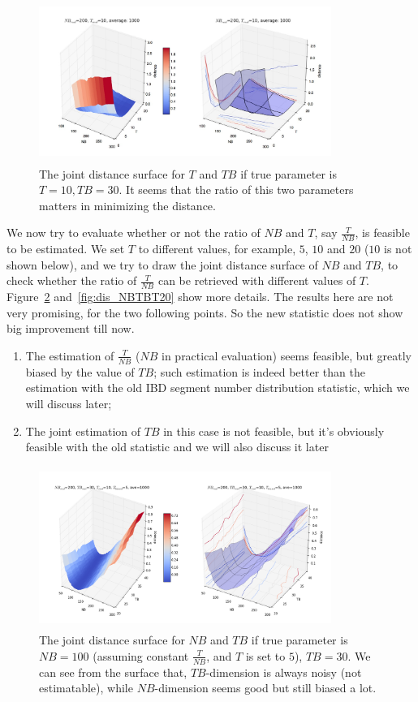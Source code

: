 \documentclass{bioinfo}
\begin{document}
\begin{figure}[h]
\centerline{\includegraphics[width=270pt, height=150pt]{like_NBT.jpg}}
\caption{The joint distance surface for $T$ and $TB$ if true parameter is $T=10,TB=30$. It seems that the ratio of this two parameters matters in minimizing the distance.}\label{fig:dis_NBT}
\end{figure}

We now try to evaluate whether or not the ratio of $NB$ and $T$, say $\frac{T}{NB}$, is feasible to be estimated. We set $T$ to different values, for example, $5$, $10$ and $20$ ($10$ is not shown below), and we try to draw the joint distance surface of $NB$ and $TB$, to check whether the ratio of $\frac{T}{NB}$ can be retrieved with different values of $T$. Figure~\ref{fig:dis_NBTBT5} and~\ref{fig:dis_NBTBT20} show more details. The results here are not very promising, for the two following points. So the new statistic does not show big improvement till now.

\begin{enumerate}
\item The estimation of $\frac{T}{NB}$ ($NB$ in practical evaluation) seems feasible, but greatly biased by the value of $TB$; such estimation is indeed better than the estimation with the old IBD segment number distribution statistic, which we will discuss later;
\item The joint estimation of $TB$ in this case is not feasible, but it's obviously feasible with the old statistic and we will also discuss it later
\end{enumerate}

\begin{figure}[h]
\centerline{\includegraphics[width=270pt, height=150pt]{like_NBTBT5_2.png}}
\caption{The joint distance surface for $NB$ and $TB$ if true parameter is $NB=100$ (assuming constant $\frac{T}{NB}$, and $T$ is set to $5$), $TB=30$. We can see from the surface that, $TB$-dimension is always noisy (not estimatable), while $NB$-dimension seems good but still biased a lot.}\label{fig:dis_NBTBT5}
\end{figure}
\end{document}
